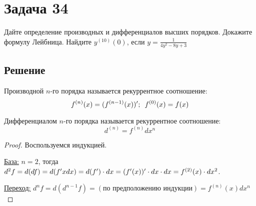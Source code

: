 
\section*{Задача 34}

Дайте определение производных и дифференциалов высших порядков. Докажите
формулу Лейбница. Найдите $y^{(10)}(0)$, если $y=\frac{1}{4y^2-8y+3}$

\subsection*{Решение}
\begin{definition}
    Производной $n$-го порядка называется рекуррентное соотношение:
        $$
        f^{(n)}(x) = (f^{(n-1)}(x))^{\prime}; \,\,\,
        f^{(0)}(x) = f(x)
        $$
\end{definition}

\begin{definition}
    Дифференциалом $n$-го порядка называется рекуррентное соотношение:
    $$
        d^{(n)} = f^{(n)}dx^{n}
    $$
\end{definition}
\begin{proof}
    Воспользуемся индукцией.

    \par\underline{База:} $n=2$, тогда $d^2f = d(df) =
    d(f^{\prime} x dx) = d(f^{\prime})\cdot dx = (f^{\prime}(x))^{\prime}\cdot dx\cdot dx =
    f^{(2)}(x)\cdot dx^2$.

    \par\underline{Переход:}
    $d^{n}f = d(d^{n-1}f) = (\text{по предположению индукции}) =
    f^{(n)}(x)dx^n$
\end{proof}

